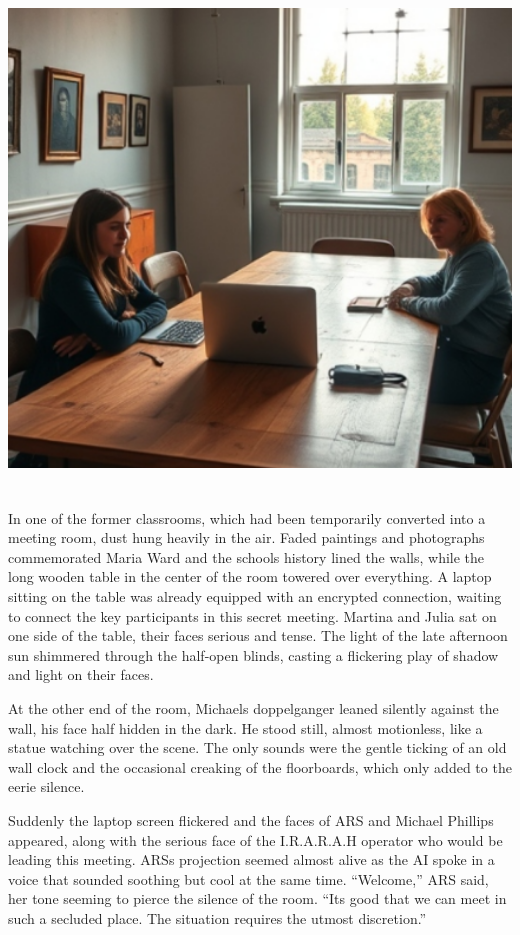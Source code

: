 \documentclass[
]{article}
\begin{document}
\includegraphics[width=5.65625in,height=5.25in]{media/image005.png}

In one of the former classrooms, which had been temporarily converted
into a meeting room, dust hung heavily in the air. Faded paintings and
photographs commemorated Maria Ward and the school\textquotesingle s
history lined the walls, while the long wooden table in the center of
the room towered over everything. A laptop sitting on the table was
already equipped with an encrypted connection, waiting to connect the
key participants in this secret meeting. Martina and Julia sat on one
side of the table, their faces serious and tense. The light of the late
afternoon sun shimmered through the half-open blinds, casting a
flickering play of shadow and light on their faces.

At the other end of the room, Michael\textquotesingle s doppelganger
leaned silently against the wall, his face half hidden in the dark. He
stood still, almost motionless, like a statue watching over the scene.
The only sounds were the gentle ticking of an old wall clock and the
occasional creaking of the floorboards, which only added to the eerie
silence.

Suddenly the laptop screen flickered and the faces of ARS and Michael
Phillips appeared, along with the serious face of the I.R.A.R.A.H
operator who would be leading this meeting. ARS\textquotesingle s
projection seemed almost alive as the AI \hspace{0pt}\hspace{0pt}spoke
in a voice that sounded soothing but cool at the same time. ``Welcome,''
ARS said, her tone seeming to pierce the silence of the room.
``It\textquotesingle s good that we can meet in such a secluded place.
The situation requires the utmost discretion.''
\end{document}
